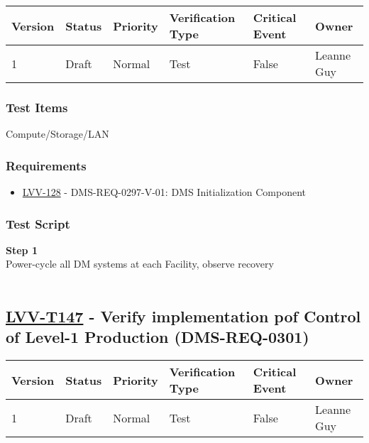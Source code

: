 \begin{longtable}[]{@{}llllll@{}}
\toprule
Version & Status & Priority & Verification Type & Critical Event &
Owner\tabularnewline
\midrule
\endhead
1 & Draft & Normal & Test & False & Leanne Guy\tabularnewline
\bottomrule
\end{longtable}

\hypertarget{test-items-122}{%
\subsubsection{Test Items}\label{test-items-122}}

Compute/Storage/LAN~

\hypertarget{requirements-123}{%
\subsubsection{Requirements}\label{requirements-123}}

\begin{itemize}
\tightlist
\item
  \href{https://jira.lsstcorp.org/browse/LVV-128}{LVV-128} -
  DMS-REQ-0297-V-01: DMS Initialization Component
\end{itemize}

\hypertarget{test-script-123}{%
\subsubsection{Test Script}\label{test-script-123}}

\textbf{Step 1}\\
Power-cycle all DM systems at each Facility, observe recovery\\
~\\

\hypertarget{lvv-t147---verify-implementation-pof-control-of-level-1-production-dms-req-0301}{%
\subsection{\texorpdfstring{\href{https://jira.lsstcorp.org/secure/Tests.jspa\#/testCase/LVV-T147}{LVV-T147}
- Verify implementation pof Control of Level-1 Production
(DMS-REQ-0301)}{LVV-T147 - Verify implementation pof Control of Level-1 Production (DMS-REQ-0301)}}\label{lvv-t147---verify-implementation-pof-control-of-level-1-production-dms-req-0301}}

\begin{longtable}[]{@{}llllll@{}}
\toprule
Version & Status & Priority & Verification Type & Critical Event &
Owner\tabularnewline
\midrule
\endhead
1 & Draft & Normal & Test & False & Leanne Guy\tabularnewline
\bottomrule
\end{longtable}

